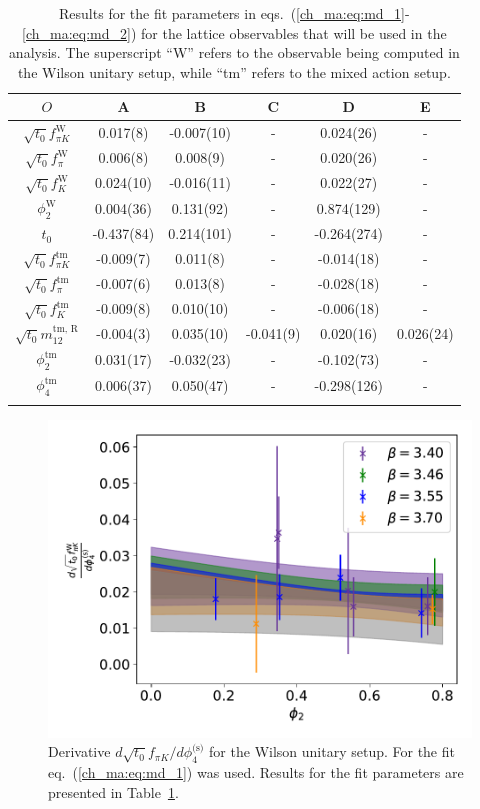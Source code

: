 \begin{longtable}{c | c c c c c}
\label{ch_ma:tab:md}
    ${O}$ & A & B & C & D & E \\
    \toprule
    $\sqrt{t_0}f_{\pi K}^{\textrm{W}}$ & 0.017(8) & -0.007(10) & - & 0.024(26) & - \\ 
    $\sqrt{t_0}f_{\pi}^{\textrm{W}}$ & 0.006(8) & 0.008(9) & - & 0.020(26) & - \\ 
    $\sqrt{t_0}f_{K}^{\textrm{W}}$ & 0.024(10) & -0.016(11) & - & 0.022(27) & - \\ 
    $\phi_2^{\textrm{W}}$ & 0.004(36) & 0.131(92) & - & 0.874(129) & - \\ 
    $t_0$ & -0.437(84) & 0.214(101) & - & -0.264(274) & - \\ 
    \midrule
    $\sqrt{t_0}f_{\pi K}^{\textrm{tm}}$ & -0.009(7) & 0.011(8) & - & -0.014(18) & - \\ 
    $\sqrt{t_0}f_{\pi}^{\textrm{tm}}$ & -0.007(6) & 0.013(8) & - & -0.028(18) & - \\ 
    $\sqrt{t_0}f_{K}^{\textrm{tm}}$ & -0.009(8) & 0.010(10) & - & -0.006(18) & - \\ 
    $\sqrt{t_0}m_{12}^{\textrm{tm, R}}$ & -0.004(3) & 0.035(10) & -0.041(9) & 0.020(16) & 0.026(24) \\ 
    $\phi_2^{\textrm{tm}}$ & 0.031(17) & -0.032(23) & - & -0.102(73) & - \\ 
    $\phi_4^{\textrm{tm}}$ & 0.006(37) & 0.050(47) & - & -0.298(126) & - \\ 
    \bottomrule
    \caption{Results for the fit parameters in eqs.~(\ref{ch_ma:eq:md_1}-\ref{ch_ma:eq:md_2}) for the lattice observables that will be used in the analysis. The superscript ``W'' refers to the observable being computed in the Wilson unitary setup, while ``tm'' refers to the mixed action setup.}
\end{longtable}

\begin{figure}
    \centering
    \includegraphics[width=1.\textwidth]{./cap4/figs/dt0fpik_w.pdf}
    \caption{Derivative $d\sqrt{t_0}f_{\pi K}/d\phi_4^{\textrm{(s)}}$ for the Wilson unitary setup. For the fit eq.~(\ref{ch_ma:eq:md_1}) was used. Results for the fit parameters are presented in Table~\ref{ch_ma:tab:md}.}
    \label{ch_ma:fig:dfpik_w}
\end{figure}

